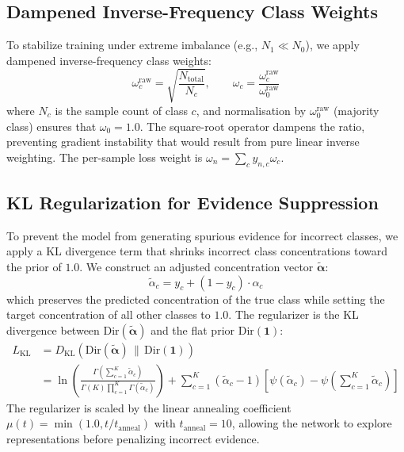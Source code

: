 \documentclass[11pt]{article}
\newcommand{\Dir}{\text{Dir}}
\newcommand{\KL}{D_{\text{KL}}}
\begin{document}
\subsection{Dampened Inverse-Frequency Class Weights}\label{subsec:class_weight}

To stabilize training under extreme imbalance (e.g., $N_1 \ll N_0$), we apply dampened inverse-frequency class weights:
\begin{equation}\label{eq:class_weights}
    \omega_c^{\text{raw}} = \sqrt{\frac{N_{\text{total}}}{N_c}}, \qquad \omega_c = \frac{\omega_c^{\text{raw}}}{\omega_0^{\text{raw}}}
\end{equation}
where $N_c$ is the sample count of class $c$, and normalisation by $\omega_0^{\text{raw}}$ (majority class) ensures that $\omega_0 = 1.0$. The square-root operator dampens the ratio, preventing gradient instability that would result from pure linear inverse weighting. The per-sample loss weight is $\omega_n = \sum_c y_{n,c} \omega_c$.

\subsection{KL Regularization for Evidence Suppression}\label{subsec:kl_reg}

To prevent the model from generating spurious evidence for incorrect classes, we apply a KL divergence term that shrinks incorrect class concentrations toward the prior of $1.0$. We construct an adjusted concentration vector $\tilde{\bm{\alpha}}$:
\begin{equation}\label{eq:alpha_tilde}
    \tilde{\alpha}_c = y_c + (1 - y_c) \cdot \alpha_c
\end{equation}
which preserves the predicted concentration of the true class while setting the target concentration of all other classes to $1.0$. The regularizer is the KL divergence between $\Dir(\tilde{\bm{\alpha}})$ and the flat prior $\Dir(\bm{1})$:
\begin{align}
    L_{\text{KL}} &= \KL\!\left(\Dir(\tilde{\bm{\alpha}}) \,\|\, \Dir(\bm{1})\right) \nonumber \\
    &= \ln \left( \frac{\Gamma\left(\sum_{c=1}^K \tilde{\alpha}_c\right)}{\Gamma(K) \prod_{c=1}^K \Gamma(\tilde{\alpha}_c)} \right) + \sum_{c=1}^K (\tilde{\alpha}_c - 1)\left[\psi(\tilde{\alpha}_c) - \psi\!\left(\sum_{c=1}^K \tilde{\alpha}_c\right)\right] \label{eq:kl_uniform}
\end{align}
The regularizer is scaled by the linear annealing coefficient $\mu(t) = \min(1.0, t / t_{\text{anneal}})$ with $t_{\text{anneal}} = 10$, allowing the network to explore representations before penalizing incorrect evidence.
\end{document}
